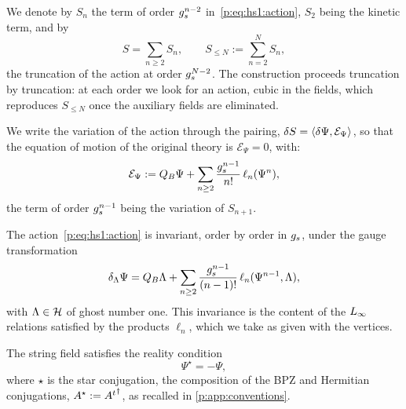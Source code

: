 We denote by $S_n$ the term of order $g_s^{n-2}$ in~\eqref{p:eq:hs1:action}, $S_2$ being the kinetic term, and by
\begin{equation}
  \label{p:eq:hs1:truncation}
  S
    = \sum_{n \ge 2} S_n,
  \qquad
  S_{\le N}
    := \sum_{n = 2}^N S_n,
\end{equation}
the truncation of the action at order $g_s^{N-2}$.
The construction proceeds truncation by truncation: at each order we look for an action, cubic in the fields, which reproduces $S_{\le N}$ once the auxiliary fields are eliminated.

We write the variation of the action through the pairing, $\delta S = \braket{\delta \Psi, \mathcal E_\Psi}_{}$, so that the equation of motion of the original theory is $\mathcal E_\Psi = 0$, with:
\begin{equation}
  \label{p:eq:hs1:eom-psi}
  \mathcal E_\Psi
    := Q_B \Psi
      + \sum_{n \ge 2} \frac{g_s^{n-1}}{n!} \, \ell_n(\Psi^n),
\end{equation}
the term of order $g_s^{n-1}$ being the variation of $S_{n+1}$.

The action~\eqref{p:eq:hs1:action} is invariant, order by order in $g_s$, under the gauge transformation~\cite{Zwiebach:1993:ClosedStringField}
\begin{equation}
  \label{p:eq:hs1:gauge-psi}
  \delta_\Lambda \Psi
    = Q_B \Lambda
      + \sum_{n \ge 2} \frac{g_s^{n-1}}{(n-1)!} \, \ell_n(\Psi^{n-1}, \Lambda),
\end{equation}
with $\Lambda \in \mathcal{H}$ of ghost number one.
This invariance is the content of the $L_\infty$ relations satisfied by the products $\ell_n$, which we take as given with the vertices.

The string field satisfies the reality condition
\begin{equation}
  \label{p:eq:hs1:reality-psi}
  \Psi^\star
    = - \Psi,
\end{equation}
where $\star$ is the star conjugation, the composition of the BPZ and Hermitian conjugations, $A^\star := {{A^t}^\dagger}$, as recalled in \cref{p:app:conventions}.

